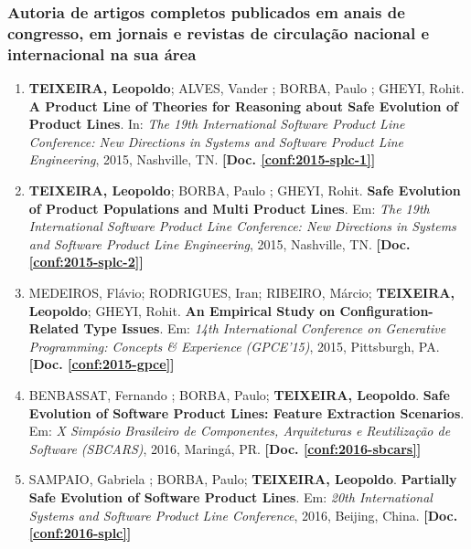 \documentclass[a4paper,oneside,10pt]{article}
\begin{document}
\subsubsection{Autoria de artigos completos publicados em anais de congresso, em jornais e revistas de circulação nacional e internacional na sua área}
\vspace{0.3cm}

\begin{enumerate}
\renewcommand{\labelenumi}{{\large\bfseries\arabic{enumi}.}}

\item \textbf{TEIXEIRA, Leopoldo}; ALVES, Vander ; BORBA, Paulo ; GHEYI, Rohit. \textbf{A Product Line of Theories for Reasoning about Safe Evolution of Product Lines}. In: \emph{The 19th International Software Product Line Conference: New Directions in Systems and Software Product Line Engineering}, 2015, Nashville, TN. \textbf{[Doc. \ref{conf:2015-splc-1}]}
%
\item \textbf{TEIXEIRA, Leopoldo}; BORBA, Paulo ; GHEYI, Rohit. \textbf{Safe Evolution of Product Populations and Multi Product Lines}. Em: \emph{The 19th International Software Product Line Conference: New Directions in Systems and Software Product Line Engineering}, 2015, Nashville, TN. \textbf{[Doc. \ref{conf:2015-splc-2}]}
%
\item MEDEIROS, Flávio; RODRIGUES, Iran; RIBEIRO, Márcio; \textbf{TEIXEIRA, Leopoldo};  GHEYI, Rohit. \textbf{An Empirical Study on Configuration-Related Type Issues}. Em: \emph{14th International Conference on Generative Programming: Concepts \& Experience (GPCE'15)}, 2015, Pittsburgh, PA. \textbf{[Doc. \ref{conf:2015-gpce}]}
%
\item BENBASSAT, Fernando ; BORBA, Paulo; \textbf{TEIXEIRA, Leopoldo}. \textbf{Safe Evolution of Software Product Lines: Feature Extraction Scenarios}. Em: \emph{X Simpósio Brasileiro de Componentes, Arquiteturas e Reutilização de Software (SBCARS)}, 2016, Maringá, PR. \textbf{[Doc. \ref{conf:2016-sbcars}]}

\item SAMPAIO, Gabriela ; BORBA, Paulo; \textbf{TEIXEIRA, Leopoldo}. \textbf{Partially Safe Evolution of Software Product Lines}. Em: \emph{20th International Systems and Software Product Line Conference}, 2016, Beijing, China. \textbf{[Doc. \ref{conf:2016-splc}]}

\end{enumerate}
\end{document}

